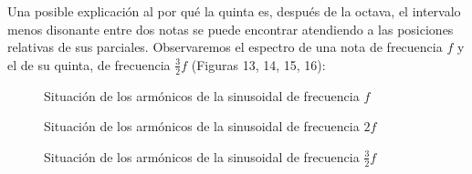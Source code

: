 \documentclass[11pt,a4paper]{article}
\begin{document}
	Una posible explicación al por qué la quinta es, después de la octava, el intervalo menos disonante entre dos notas se puede encontrar atendiendo a las posiciones relativas de sus parciales. Observaremos el espectro de una nota de frecuencia $f$ y el de su quinta, de frecuencia $\frac{3}{2}f$ (Figuras 13, 14, 15, 16):
		
    
    \begin{figure}[h]
        \centering
        \caption{Situación de los armónicos de la sinusoidal de frecuencia $f$}
    \end{figure}
    
    \begin{figure}[h]
        \centering
        \caption{Situación de los armónicos de la sinusoidal de frecuencia $2f$}
    \end{figure}
    
    \begin{figure}[h]
        \centering
        \caption{Situación de los armónicos de la sinusoidal de frecuencia $\frac{3}{2} f$}
    \end{figure}
    
\end{document}
